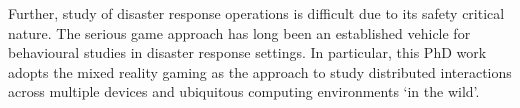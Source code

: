 Further, study of disaster response operations is difficult due to its safety critical nature. The serious game approach has long been an established vehicle for behavioural studies in disaster response settings. In particular, this PhD work adopts the mixed reality gaming as the  approach to study distributed interactions across multiple devices and ubiquitous computing environments `in the wild'. \\


